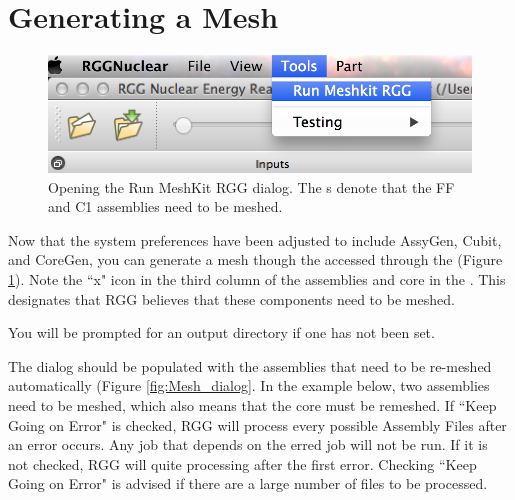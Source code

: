 \section{Generating a Mesh}

\begin{figure}
       \vspace{-60pt}
	\begin{center}
		\includegraphics[width=0.95\linewidth]{Images/mesh-3.png}
		\caption{Opening the Run MeshKit RGG dialog.  The s denote that the FF and C1 assemblies need to be meshed.}
		\label{fig:Mesh_Menu}
	\end{center}
	 \vspace{-20pt}
\end{figure}

Now that the system preferences have been adjusted to include AssyGen, Cubit, and CoreGen, you can generate a mesh  though the  accessed through the  (Figure \ref{fig:Mesh_Menu}).  Note the ``x" icon in the third column of the assemblies and core in the .  This designates that RGG believes that these components need to be meshed.

You will be prompted for an output directory if one has not been set.

The dialog should be populated with the assemblies that need to be re-meshed automatically (Figure \ref{fig:Mesh_dialog}.  In the example below, two assemblies need to be meshed, which also means that the core must be remeshed.  If ``Keep Going on Error" is checked, RGG will process every possible Assembly Files after an error occurs.  Any job that depends on the erred job will not be run.  If it is not checked, RGG will quite processing after the first error.  Checking ``Keep Going on Error" is advised if there are a large number of files to be processed.

